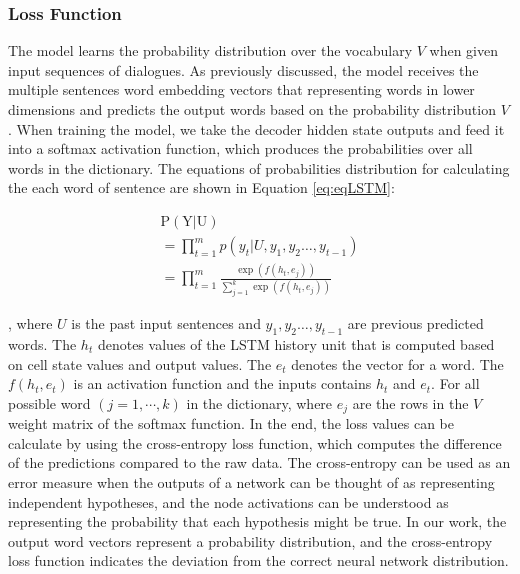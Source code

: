 {{\subsubsection{Loss Function}

The model learns the probability distribution over the vocabulary $V$ when given input sequences of dialogues. As previously discussed, the model receives the multiple sentences word embedding vectors that representing words in lower dimensions and predicts the output words based on the probability distribution $V$. When training the model, we take the decoder hidden state outputs and feed it into a softmax activation function, which produces the probabilities over all words in the dictionary. The equations of probabilities distribution for calculating the each word of sentence are shown in Equation \ref{eq:eqLSTM}:

\begin{equation} \label{eq:eqLSTM}
\begin{array}{l}{\mathrm{P}(\mathrm{Y} | \mathrm{U})} \\ {=\prod_{t=1}^{m} p\left(y_{t} | U, y_{1}, y_{2} \ldots, y_{t-1}\right)} \\ {=\prod_{t=1}^{m} \frac{\exp \left(f\left(h_{t}, e_{j}\right)\right)}{\sum_{j=1}^{k} \exp \left(f\left(h_{t}, e_{j}\right)\right)}}\end{array}
\end{equation}

, where $U$ is the past input sentences and $y_{1}, y_{2} \ldots, y_{t-1}$ are previous predicted words. The $h_{t}$ denotes values of the LSTM history unit that is computed  based on cell state values and output values. The $e_{t}$ denotes the vector for a word. The $f\left(h_{t}, e_{t}\right)$ is an activation function and the inputs contains $h_{t}$ and $e_{t}$. For all possible word $\left(j = 1,\cdots,k\right)$ in the dictionary, where $e_{j}$ are the rows in the $V$ weight matrix of the softmax function. In the end, the loss values can be calculate by using the cross-entropy loss function, which computes the difference of the predictions compared to the raw data. The cross-entropy can be used as an error measure when the outputs of a network can be thought of as representing independent hypotheses, and the node activations can be understood as representing the probability that each hypothesis might be true. In our work, the output word vectors represent a probability distribution, and the cross-entropy loss function indicates the deviation from the correct neural network distribution.

}}
